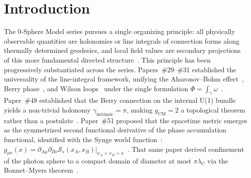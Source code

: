 \documentclass[%
 reprint, amsmath,amssymb, aps, prd, ]{revtex4-2}
\numberwithin{equation}{section}
\newcommand{\lambdaC}{\lambda_{\mathrm{C}}}
\newcommand{\BerryF}{\mathcal{F}}
\newcommand{\SyngeS}{\mathcal{S}}
\begin{document}
\begin{abstract}
If the triangle closes --- if $\BerryF_{\mu\nu}$ can be identified with $R^\rho{}_{\sigma\mu\nu}$ on the Bonnet--Myers-bounded domain, and if the Synge reconstruction extends consistently to curved spacetime --- then the gauge and gravitational sectors of the 0-Sphere Model emerge from a single internal phase accumulation functional, the directional decomposition of Paper~\#52 acquires a geometric derivation rather than an analogy, and open tasks O3 and O4 of the programme guide (Paper~\#54) are resolved simultaneously.
The paper is a Structural Proposal: the vertices are established; the edges are formulated; the closing of the triangle is deferred to subsequent work. This framework implicitly suggests a Koopman-operator-like spectral decomposition of the 0-sphere dynamics.
\end{abstract}

\maketitle

\section{Introduction}
\label{sec:intro}

The 0-Sphere Model series pursues a single organizing principle: all physically observable quantities are holonomies or line integrals of connection forms along thermally determined geodesics, and local field values are secondary projections of this more fundamental directed structure~\cite{hanamura31,hanamura29}.
This principle has been progressively substantiated across the series.
Papers~\#29--\#31 established the universality of the line-integral framework, unifying the Aharonov--Bohm effect~\cite{AharonovBohm1959}, Berry phase~\cite{Berry1984}, and Wilson loops~\cite{Wilson1974} under the single formulation $\Phi = \int_\gamma \omega$~\cite{hanamura31}.
Paper~\#48 established that the Berry connection on the internal U(1) bundle yields a non-trivial holonomy $\gamma_\mathrm{intrinsic} = \pi$, making $g_\mathrm{CM} = 2$ a topological theorem rather than a postulate~\cite{hanamura48}.
Paper~\#51 proposed that the spacetime metric emerges as the symmetrized second functional derivative of the phase accumulation functional, identified with the Synge world function~\cite{Synge1960}: $g_{\mu\nu}(x) = \partial_{A\mu}\partial_{B\nu}\SyngeS_s(x_A, x_B)|_{x_A = x_B = x}$~\cite{hanamura51}.
That same paper derived confinement of the photon sphere to a compact domain of diameter at most $\pi\lambdaC$ via the Bonnet--Myers theorem~\cite{Myers1941}.
\end{document}
